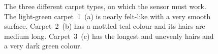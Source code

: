 \documentclass[12pt,a4paper]{article}
\begin{document}
\begin{figure}[htbp]
  \begin{center}
      \hfill
      \hfill
    \caption{
      The three different carpet types, on which the sensor must work.
      The light-green carpet~1~(a) is nearly felt-like with a very smooth surface.
      Carpet~2~(b) has a mottled teal colour and its hairs are medium long.
      Carpet~3~(c) has the longest and unevenly hairs and a very dark green colour.
    }
    \label{fig:carpets}
  \end{center}
\end{figure}
\end{document}
